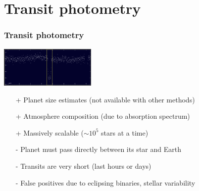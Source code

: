 \documentclass[aspectratio=169]{beamer}
\begin{document}
\section{Transit photometry}
\begin{frame}
\frametitle{Transit photometry}

\includegraphics[width=0.35\textwidth]{img/zooniverse.org/obvious_transit.png}

\begin{itemize}
\item[+] Planet size estimates (not available with other methods)
\item[+] Atmosphere composition (due to absorption spectrum)
\item[+] Massively scalable ($\sim 10^5$ stars at a time)
\item[-] Planet must pass directly between its star and Earth
\item[-] Transits are very short (last hours or days)
\item[-] False positives due to eclipsing binaries, stellar variability
\end{itemize}
\end{frame}
\end{document}
